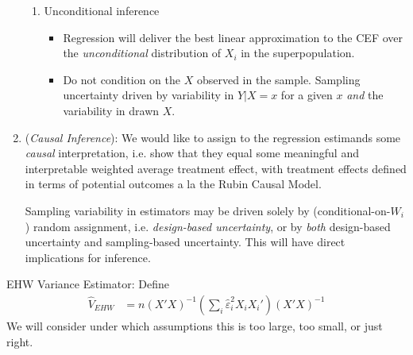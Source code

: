 \documentclass[12pt]{article}
\theoremstyle{plain}
\theoremstyle{definition}
\theoremstyle{remark}
\DeclareMathOperator*{\argmin}{arg\;min}
\newcommand{\sumin}{\sum^n_{i=1}}
\begin{document}
\begin{enumerate}
\begin{enumerate}[label=(\alph*)]
      \item Unconditional inference
        \begin{itemize}
          \item Regression will deliver the best linear approximation to
            the CEF over the \emph{unconditional} distribution of $X_i$
            in the superpopulation.
          \item Do not condition on the $X$ observed in the
            sample.
            Sampling uncertainty driven by variability in $Y|X=x$
            for a given $x$ \emph{and} the variability in drawn $X$.
        \end{itemize}
    \end{enumerate}

  \item
    (\emph{Causal Inference}):
    We would like to assign to the regression estimands some
    \emph{causal} interpretation, i.e. show that they equal some
    meaningful and interpretable weighted average treatment effect, with
    treatment effects defined in terms of potential outcomes a la the
    Rubin Causal Model.

    Sampling variability in estimators may be driven solely by
    (conditional-on-$W_i$) random assignment, i.e.
    \emph{design-based uncertainty}, or by \emph{both} design-based
    uncertainty and sampling-based uncertainty.
    This will have direct implications for inference.
\end{enumerate}
EHW Variance Estimator:
Define
\begin{align*}
  \hat{V}_{EHW}
  &=
  n(X'X)^{-1}
  \left(
  \sum_i \hat{\varepsilon}^2_i X_iX_i'
  \right)
  (X'X)^{-1}
\end{align*}
We will consider under which assumptions this is too large, too small,
or just right.



\clearpage
\end{document}
